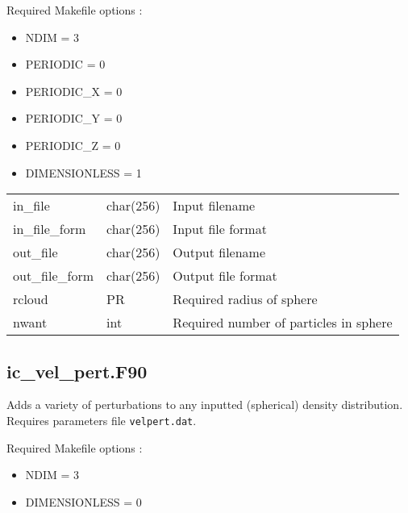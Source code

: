 \documentclass[a4paper]{article}
\newcommand{\var}[1]{\texttt{#1}}
\begin{document}
\noindent Required Makefile options :
\begin{itemize}
\item NDIM = 3
\item PERIODIC = 0
\item PERIODIC\_X = 0
\item PERIODIC\_Y = 0
\item PERIODIC\_Z = 0
\item DIMENSIONLESS = 1
\end{itemize}

\vspace{0.1cm}

\begin{center}
\begin{supertabular}{|p{3cm}|p{2cm}|p{8cm}|}
in\_file         & char(256) & Input filename \\
in\_file\_form   & char(256) & Input file format \\
out\_file        & char(256) & Output filename \\
out\_file\_form  & char(256) & Output file format \\
rcloud           & PR        & Required radius of sphere \\
nwant            & int       & Required number of particles in sphere \\
\end{supertabular}
\end{center}


\newpage


\subsection{ic\_vel\_pert.F90}
Adds a variety of perturbations to any inputted (spherical) density distribution.  Requires parameters file \var{velpert.dat}. \newline

\noindent Required Makefile options :
\begin{itemize}
\item NDIM = 3
\item DIMENSIONLESS = 0
\end{itemize}

\vspace{0.1cm}
\end{document}
